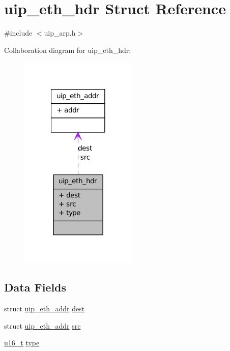 \hypertarget{structuip__eth__hdr}{
\section{uip\_\-eth\_\-hdr Struct Reference}
\label{structuip__eth__hdr}
}


{\ttfamily \#include $<$uip\_\-arp.h$>$}



Collaboration diagram for uip\_\-eth\_\-hdr:
\nopagebreak
\begin{figure}[H]
\begin{center}
\leavevmode
\includegraphics[width=158pt]{structuip__eth__hdr__coll__graph}
\end{center}
\end{figure}
\subsection*{Data Fields}
\begin{DoxyCompactItemize}
\item 
struct \hyperlink{structuip__eth__addr}{uip\_\-eth\_\-addr} \hyperlink{structuip__eth__hdr_ab684c17bf48c8e3b3fcf97b06b4c6ee1}{dest}
\item 
struct \hyperlink{structuip__eth__addr}{uip\_\-eth\_\-addr} \hyperlink{structuip__eth__hdr_a1abbbe7bc5d7d033c727691528b85b8d}{src}
\item 
\hyperlink{group__uipfw_ga77570ac4fcab86864fa1916e55676da2}{u16\_\-t} \hyperlink{structuip__eth__hdr_ac9273cc1fcdaeeddc523ca9f34977e06}{type}
\end{DoxyCompactItemize}


